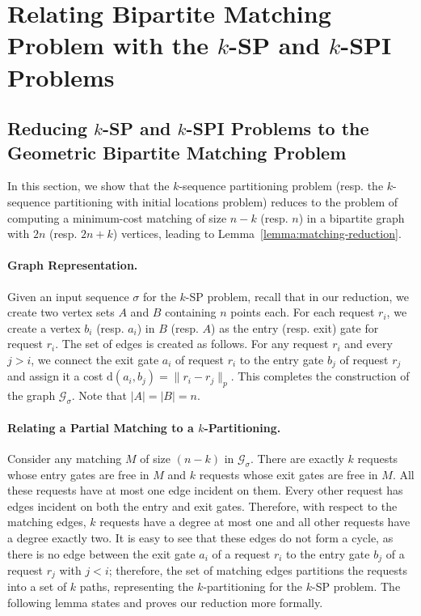 \documentclass[11pt,onecolumn]{article}
\def\mcG{{\mathcal{G}}}
\newcommand{\distance}[2]{\mathrm{d}(#1, #2)}
\newcommand{\requests}{\sigma}
\newcommand\myparagraph[1]{\paragraph{#1}}
\begin{document}
\newpage
\appendix
\section{Relating Bipartite Matching Problem with the \texorpdfstring{$k$}{-}-SP and \texorpdfstring{$k$}{-}-SPI Problems}

\subsection{Reducing \texorpdfstring{$k$}{}-SP and \texorpdfstring{$k$}{}-SPI Problems to the Geometric Bipartite Matching Problem}\label{sec:background}
In this section, we show that the $k$-sequence partitioning problem (resp. the $k$-sequence partitioning with initial locations problem) reduces to the problem of computing a minimum-cost matching of size $n-k$ (resp. $n$) in a bipartite graph with $2n$ (resp. $2n+k$) vertices, leading to Lemma~\ref{lemma:matching-reduction}. 

%

\myparagraph{Graph Representation.} Given an input sequence $\requests$ for the $k$-SP problem, recall that in our reduction, we create two vertex sets $A$ and $B$ containing $n$ points each. For each request $r_i$, we create a vertex $b_i$ (resp. $a_i$) in $B$ (resp. $A$) as the entry (resp. exit) gate for request $r_i$. The set of edges is created as follows. For any request $r_i$ and every $j > i$, we connect the exit gate $a_i$ of request $r_i$ to the entry gate $b_j$ of request $r_j$ and assign it a cost $\distance{a_i}{b_j}=\|r_i-r_j\|_p$. 
This completes the construction of the graph $\mcG_\requests$. Note that $|A|=|B|=n$.



\myparagraph{Relating a Partial Matching to a $k$-Partitioning.} 
Consider any matching $M$ of size $(n-k)$ in $\mcG_\requests$. There are exactly $k$ requests whose entry gates are free in $M$ and $k$ requests whose exit gates are free in $M$. All these requests have at most one edge incident on them. Every other request has edges incident on both the entry and exit gates. Therefore, with respect to the matching edges, $k$ requests have a degree at most one and all other requests have a degree exactly two. It is easy to see that these edges do not form a cycle, as there is no edge between the exit gate $a_i$ of a request $r_i$ to the entry gate $b_j$ of a request $r_j$ with $j<i$; therefore, the set of matching edges partitions the requests into a set of $k$ paths, representing the $k$-partitioning for the $k$-SP problem. The following lemma states and proves our reduction more formally. 
\end{document}
